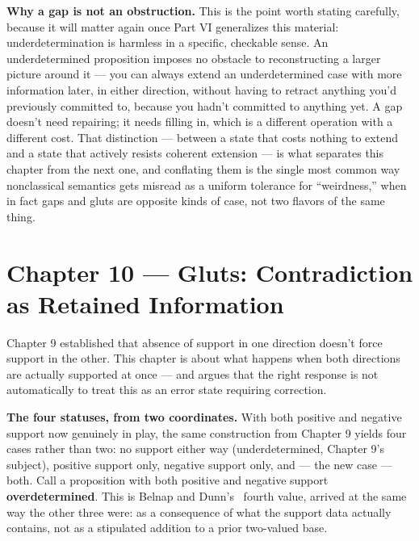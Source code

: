 \textbf{Why a gap is not an obstruction.} This is the point worth stating
carefully, because it will matter again once Part VI generalizes this
material: underdetermination is harmless in a specific, checkable sense.
An underdetermined proposition imposes no obstacle to reconstructing a
larger picture around it --- you can always extend an underdetermined case
with more information later, in either direction, without having to
retract anything you'd previously committed to, because you hadn't
committed to anything yet. A gap doesn't need repairing; it needs
filling in, which is a different operation with a different cost. That
distinction --- between a state that costs nothing to extend and a state
that actively resists coherent extension --- is what separates this
chapter from the next one, and conflating them is the single most common
way nonclassical semantics gets misread as a uniform tolerance for
``weirdness,'' when in fact gaps and gluts are opposite kinds of case, not
two flavors of the same thing.

\hypertarget{chapter-10-gluts-contradiction-as-retained-information}{%
\chapter*{Chapter 10 --- Gluts: Contradiction as Retained Information}
\label{chapter-10-gluts-contradiction-as-retained-information}}

Chapter 9 established that absence of support in one direction doesn't
force support in the other. This chapter is about what happens when both
directions are actually supported at once --- and argues that the right
response is not automatically to treat this as an error state requiring
correction.

\textbf{The four statuses, from two coordinates.} With both positive and
negative support now genuinely in play, the same construction from
Chapter 9 yields four cases rather than two: no support either way
(underdetermined, Chapter 9's subject), positive support only, negative
support only, and --- the new case --- both. Call a proposition with both
positive and negative support \textbf{overdetermined}. This is Belnap and
Dunn's~\cite{belnap1977,dunn1976} fourth value, arrived at the same way the other three were: as a
consequence of what the support data actually contains, not as a
stipulated addition to a prior two-valued base.


